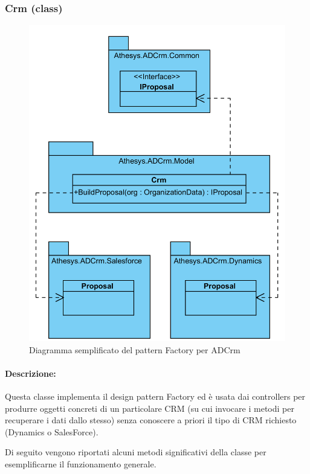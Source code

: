 \subsubsection{Crm (class)} \label{crmClass}
\begin{figure}[H]
	\centering
	\includegraphics[width=\linewidth]{images/factoryInADCrm}
	\caption{Diagramma semplificato del pattern Factory per ADCrm}
	\label{fig:factoryInADCrm}
\end{figure}
\paragraph{Descrizione:}
Questa classe implementa il design pattern Factory ed è usata dai controllers per produrre oggetti concreti di un particolare CRM (su cui invocare i metodi per recuperare i dati dallo stesso) senza conoscere a priori il tipo di CRM richiesto (Dynamics o SalesForce).


Di seguito vengono riportati alcuni metodi significativi della classe per esemplificarne il funzionamento generale.



